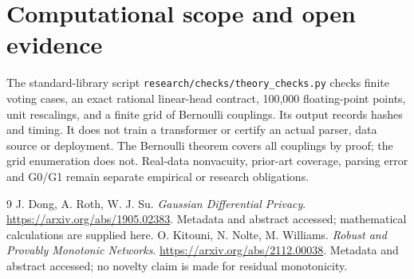 \documentclass[11pt]{article}
\begin{document}
\section{Computational scope and open evidence}
The standard-library script \texttt{research/checks/theory\_checks.py}
checks finite voting cases, an exact rational linear-head contract,
100,000 floating-point points, unit rescalings, and a finite grid of
Bernoulli couplings. Its output records hashes and timing. It does not
train a transformer or certify an actual parser, data source or deployment.
The Bernoulli theorem covers all couplings by proof; the grid enumeration
does not. Real-data nonvacuity, prior-art coverage, parsing error and G0/G1
remain separate empirical or research obligations.

\begin{thebibliography}{9}
 J. Dong, A. Roth, W. J. Su.
\emph{Gaussian Differential Privacy}.
\url{https://arxiv.org/abs/1905.02383}.
Metadata and abstract accessed; mathematical calculations are supplied here.
 O. Kitouni, N. Nolte, M. Williams.
\emph{Robust and Provably Monotonic Networks}.
\url{https://arxiv.org/abs/2112.00038}.
Metadata and abstract accessed; no novelty claim is made for residual monotonicity.
\end{thebibliography}
\end{document}
